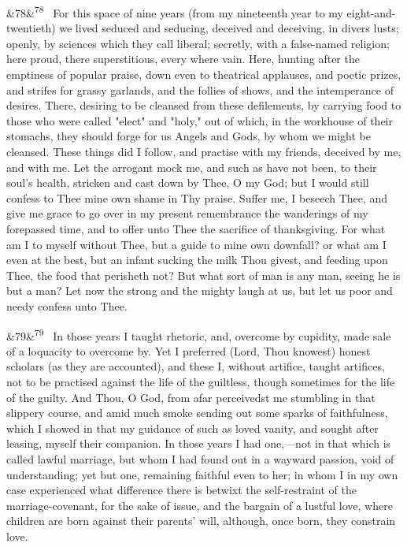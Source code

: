 \documentclass[12pt]{article}
\newcommand{\para}[1][]{\par\noindent\ifx&#1&\else\textsuperscript{\footnotesize #1}~\fi}
\begin{document}
\para[78] For this space of nine years (from my nineteenth year to my eight-and-twentieth) we lived seduced and seducing, deceived and deceiving, in divers lusts; openly, by sciences which they call liberal; secretly, with a false-named religion; here proud, there superstitious, every where vain. Here, hunting after the emptiness of popular praise, down even to theatrical applauses, and poetic prizes, and strifes for grassy garlands, and the follies of shows, and the intemperance of desires. There, desiring to be cleansed from these defilements, by carrying food to those who were called "elect" and "holy," out of which, in the workhouse of their stomachs, they should forge for us Angels and Gods, by whom we might be cleansed. These things did I follow, and practise with my friends, deceived by me, and with me. Let the arrogant mock me, and such as have not been, to their soul's health, stricken and cast down by Thee, O my God; but I would still confess to Thee mine own shame in Thy praise. Suffer me, I beseech Thee, and give me grace to go over in my present remembrance the wanderings of my forepassed time, and to offer unto Thee the sacrifice of thanksgiving. For what am I to myself without Thee, but a guide to mine own downfall? or what am I even at the best, but an infant sucking the milk Thou givest, and feeding upon Thee, the food that perisheth not? But what sort of man is any man, seeing he is but a man? Let now the strong and the mighty laugh at us, but let us poor and needy confess unto Thee.

\para[79] In those years I taught rhetoric, and, overcome by cupidity, made sale of a loquacity to overcome by. Yet I preferred (Lord, Thou knowest) honest scholars (as they are accounted), and these I, without artifice, taught artifices, not to be practised against the life of the guiltless, though sometimes for the life of the guilty. And Thou, O God, from afar perceivedst me stumbling in that slippery course, and amid much smoke sending out some sparks of faithfulness, which I showed in that my guidance of such as loved vanity, and sought after leasing, myself their companion. In those years I had one,---not in that which is called lawful marriage, but whom I had found out in a wayward passion, void of understanding; yet but one, remaining faithful even to her; in whom I in my own case experienced what difference there is betwixt the self-restraint of the marriage-covenant, for the sake of issue, and the bargain of a lustful love, where children are born against their parents' will, although, once born, they constrain love.
\end{document}

